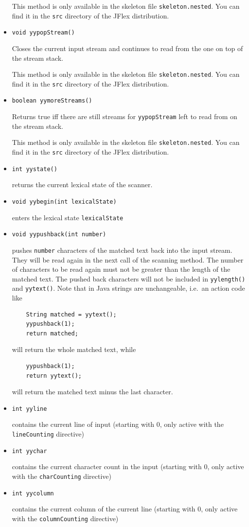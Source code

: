 \begin{itemize}
  This method is only available in the skeleton file
  \texttt{skeleton.nested}. You can find it in the \texttt{src}
  directory of the JFlex distribution.
\item
  \texttt{void\ yypopStream()}

  Closes the current input stream and continues to read from the one on
  top of the stream stack.

  This method is only available in the skeleton file
  \texttt{skeleton.nested}. You can find it in the \texttt{src}
  directory of the JFlex distribution.
\item
  \texttt{boolean\ yymoreStreams()}

  Returns true iff there are still streams for \texttt{yypopStream} left
  to read from on the stream stack.

  This method is only available in the skeleton file
  \texttt{skeleton.nested}. You can find it in the \texttt{src}
  directory of the JFlex distribution.
\item
  \texttt{int\ yystate()}

  returns the current lexical state of the scanner.
\item
  \texttt{void\ yybegin(int\ lexicalState)}

  enters the lexical state \texttt{lexicalState}
\item
  \texttt{void\ yypushback(int\ number)}

  pushes \texttt{number} characters of the matched text back into the
  input stream. They will be read again in the next call of the scanning
  method. The number of characters to be read again must not be greater
  than the length of the matched text. The pushed back characters will
  not be included in \texttt{yylength()} and \texttt{yytext()}. Note
  that in Java strings are unchangeable, i.e.~an action code like

\begin{verbatim}
    String matched = yytext();
    yypushback(1);
    return matched;
\end{verbatim}

  will return the whole matched text, while

\begin{verbatim}
    yypushback(1);
    return yytext();
\end{verbatim}

  will return the matched text minus the last character.
\item
  \texttt{int\ yyline}

  contains the current line of input (starting with 0, only active with
  the \texttt{lineCounting} directive)
\item
  \texttt{int\ yychar}

  contains the current character count in the input (starting with 0,
  only active with the \texttt{charCounting} directive)
\item
  \texttt{int\ yycolumn}

  contains the current column of the current line (starting with 0, only
  active with the \texttt{columnCounting} directive)
\end{itemize}

